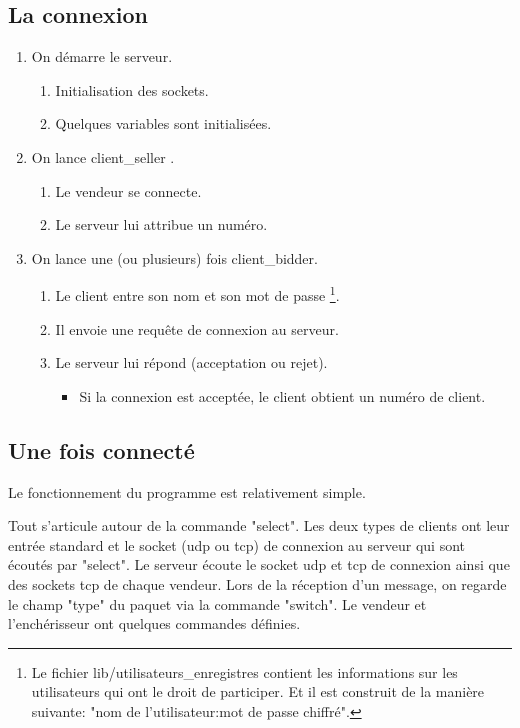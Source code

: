 \subsection{La connexion}
\begin{enumerate}
\item On démarre le serveur.
	\begin{enumerate}
	\item Initialisation des sockets.
	\item Quelques variables sont initialisées.
	\end{enumerate}
\item On lance client\_seller .
	\begin{enumerate}
	\item Le vendeur se connecte.
	\item Le serveur lui attribue un numéro.
	\end{enumerate}
\item On lance une (ou plusieurs) fois client\_bidder.
	\begin{enumerate}
	\item Le client entre son nom et son mot de passe
\protect\footnote{
Le fichier lib/utilisateurs\_enregistres contient les informations sur les utilisateurs qui ont le droit de participer.
Et il est construit de la manière suivante: "nom de l'utilisateur:mot de passe chiffré".
}.
	\item Il envoie une requête de connexion au serveur.
	\item Le serveur lui répond (acceptation ou rejet).
		\begin{itemize}
		\item Si la connexion est acceptée, le client obtient un numéro de client.
		\end{itemize}
	\end{enumerate}
\end{enumerate}

\subsection{Une fois connecté}
Le fonctionnement du programme est relativement simple.

Tout s'articule autour de la commande "select".
Les deux types de clients ont leur entrée standard et le socket (udp ou tcp) 
de connexion au serveur qui sont écoutés par "select".
Le serveur écoute le socket udp et tcp de connexion ainsi que des sockets tcp de chaque vendeur.
Lors de la réception d'un message, on regarde le champ "type" du paquet via la commande "switch".
Le vendeur et l'enchérisseur ont quelques commandes définies.

